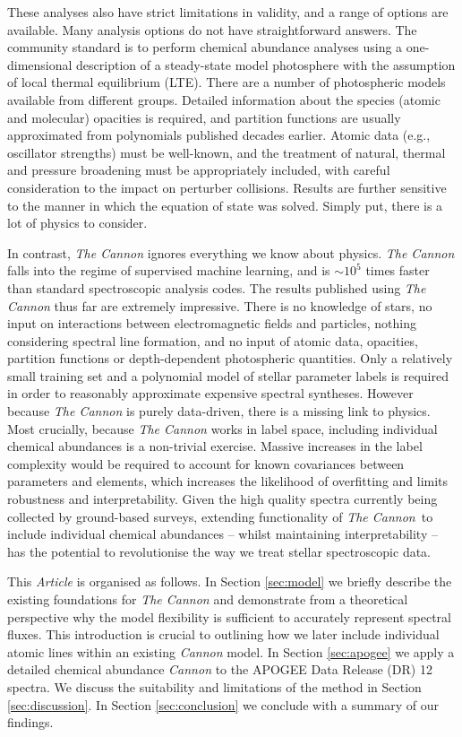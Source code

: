 \documentclass[useAMS,usenatbib]{mn2e}
\newcommand\article{\textit{Article}}
\newcommand\tc{\textit{The Cannon}}
\begin{document}
These analyses also have strict limitations in validity, and a range of options
are available.  Many analysis options do not have straightforward answers. The 
community standard is to perform chemical abundance analyses using a 
one-dimensional description of a steady-state model photosphere with the
assumption of local thermal equilibrium (LTE). There are a number of 
photospheric models available from different groups.  Detailed information about
the species (atomic and molecular) opacities is required, and partition functions
are usually approximated from polynomials published decades earlier. Atomic 
data (e.g., oscillator strengths) must be well-known, and the treatment of 
natural, thermal and pressure broadening must be appropriately included,
with careful consideration to the impact on perturber collisions. Results are 
further sensitive to the manner in which the equation of state was solved. 
Simply put, there is a lot of physics to consider.

In contrast, \tc{} \citep{Ness15a} ignores everything we know about physics.
\tc{} falls into the regime of supervised machine learning, and is $\sim10^5$
times faster than standard spectroscopic analysis codes. The results published 
using \tc{} thus far are extremely impressive. There is no knowledge of 
stars, no input on interactions between electromagnetic fields and particles, nothing considering
spectral line formation, and no input of atomic data, opacities, partition functions 
or depth-dependent photospheric quantities. Only a relatively small training set
and a polynomial model of stellar parameter labels is required in order to 
reasonably approximate expensive spectral syntheses. However because 
\tc{} is purely data-driven, there is a missing link to physics. Most crucially,
because \tc{} works in label space, including individual chemical abundances
is a non-trivial exercise. Massive increases in the label complexity would be
required to account for known covariances between parameters and elements,
which increases the likelihood of overfitting and limits robustness and interpretability.
Given the high quality spectra currently being collected by ground-based surveys,
extending functionality of \tc\ to include individual chemical abundances -- whilst
maintaining interpretability -- has the potential to revolutionise the way we 
treat stellar spectroscopic data. 

This \article{} is organised as follows. In Section \ref{sec:model} we briefly describe
the existing foundations for \tc{} and demonstrate from a theoretical perspective why
the model flexibility is sufficient to accurately represent spectral fluxes. This 
introduction is crucial to outlining how we later include individual atomic lines within 
an existing \textit{Cannon} model. In Section \ref{sec:apogee} we apply a detailed
chemical abundance \textit{Cannon} to the APOGEE Data Release (DR) 12 spectra.
We discuss the suitability and limitations of the method in Section \ref{sec:discussion}.
In Section \ref{sec:conclusion} we conclude with a summary of our findings.
\end{document}
